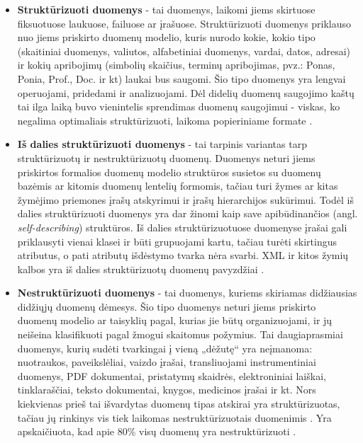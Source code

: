 \documentclass{VUMIFPSkursinis}
\begin{document}
\begin{itemize}
\item \textbf{Struktūrizuoti duomenys} - tai duomenys, laikomi jiems skirtuose fiksuotuose laukuose, failuose ar įrašuose. Struktūrizuoti duomenys priklauso nuo jiems priskirto duomenų modelio, kuris nurodo kokie, kokio tipo (skaitiniai duomenys, valiutos, alfabetiniai duomenys, vardai, datos, adresai) ir kokių apribojimų (simbolių skaičius, terminų apribojimas, pvz.: Ponas, Ponia, Prof., Doc. ir kt) laukai bus saugomi. Šio tipo duomenys yra lengvai operuojami, pridedami ir analizuojami. Dėl didelių duomenų saugojimo kaštų tai  ilga laiką buvo vienintelis sprendimas duomenų saugojimui - viskas, ko negalima optimaliais struktūrizuoti, laikoma popieriniame formate \cite{structured_data}.

\item \textbf{Iš dalies struktūrizuoti duomenys} \cite{semistructured_data} - tai tarpinis variantas tarp struktūrizuotų ir nestruktūrizuotų duomenų. Duomenys neturi jiems priskirtos formalios duomenų modelio struktūros susietos su duomenų bazėmis ar kitomis duomenų lentelių formomis, tačiau turi žymes ar kitas žymėjimo priemones įrašų atskyrimui ir įrašų hierarchijos sukūrimui. Todėl iš dalies struktūrizuoti duomenys yra dar žinomi kaip save apibūdinančios (angl. \textit{self-describing}) struktūros. Iš dalies struktūrizuotuose duomenyse įrašai gali priklausyti vienai klasei ir būti grupuojami kartu, tačiau turėti skirtingus atributus, o pati atributų išdėstymo tvarka nėra svarbi. XML ir kitos žymių kalbos yra iš dalies struktūrizuotų duomenų pavyzdžiai \cite{structured_data}.

\item \textbf{Nestruktūrizuoti duomenys} - tai duomenys, kuriems skiriamas didžiausias didžiųjų duomenų dėmesys. Šio tipo duomenys neturi jiems priskirto duomenų modelio ar taisyklių pagal, kurias jie būtų organizuojami, ir jų neišeina klasifikuoti pagal žmogui skaitomus požymius. Tai daugiaprasmiai duomenys, kurių sudėti tvarkingai į vieną „dėžutę“ yra neįmanoma: nuotraukos, paveikslėliai, vaizdo įrašai, transliuojami instrumentiniai duomenys, PDF dokumentai, pristatymų skaidrės, elektroniniai laiškai, tinklaraščiai, teksto dokumentai, knygos, medicinos įrašai ir kt. Nors kiekvienas prieš tai išvardytas duomenų tipas atskirai yra struktūrizuotas, tačiau jų rinkinys vis tiek laikomas nestruktūrizuotais duomenimis \cite{structured_data}. Yra apskaičiuota, kad apie 80\% visų duomenų yra nestruktūrizuoti \cite{unstructured}.
\end{itemize} 
\end{document}

